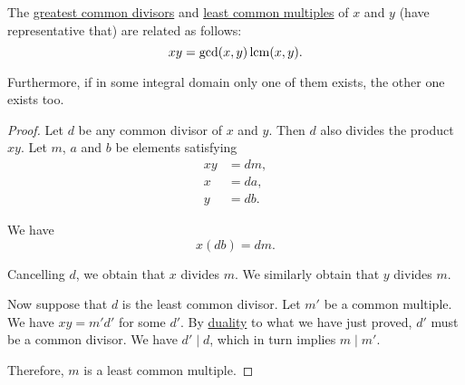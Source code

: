 \begin{proposition}\label{thm:gcd_and_lcm}
  The \hyperref[def:gcd_and_lcm]{greatest common divisors} and \hyperref[def:gcd_and_lcm]{least common multiples} of \( x \) and \( y \) (have representative that) are related as follows:
  \begin{equation}\label{eq:thm:gcd_and_lcm}
    xy = \gcd(x, y) \operatorname{lcm}(x, y).
  \end{equation}

  Furthermore, if in some integral domain only one of them exists, the other one exists too.
\end{proposition}
\begin{proof}
  Let \( d \) be any common divisor of \( x \) and \( y \). Then \( d \) also divides the product \( xy \). Let \( m \), \( a \) and \( b \) be elements satisfying
  \begin{align*}
    xy &= d m, \\
     x &= d a, \\
     y &= d b.
  \end{align*}

  We have
  \begin{equation*}
    x (db) = d m.
  \end{equation*}

  Cancelling \( d \), we obtain that \( x \) divides \( m \). We similarly obtain that \( y \) divides \( m \).

  Now suppose that \( d \) is the least common divisor. Let \( m' \) be a common multiple. We have \( xy = m' d' \) for some \( d' \). By \hyperref[thm:preorder_duality]{duality} to what we have just proved, \( d' \) must be a common divisor. We have \( d' \mid d \), which in turn implies \( m \mid m' \).

  Therefore, \( m \) is a least common multiple.
\end{proof}

